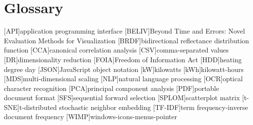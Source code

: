 
\chapter{Glossary}


\begin{acronym}[API]
[API]{application programming interface}
[BELIV]{Beyond Time and Errors: Novel Evaluation Methods for Visualization}
[BRDF]{bidirectional reflectance distribution function}
[CCA]{canonical correlation analysis}
[CSV]{comma-separated values}
[DR]{dimensionality reduction}
[FOIA]{Freedom of Information Act}
[HDD]{heating degree day}
[JSON]{JavaScript object notation}
[kW]{kilowatts}
[kWh]{kilowatt-hours}
[MDS]{multi-dimensional scaling}
[NLP]{natural language processing}
[OCR]{optical character recognition}
[PCA]{principal component analysis}
[PDF]{portable document format}
[SFS]{sequential forward selection}
[SPLOM]{scatterplot matrix}
[t-SNE]{t-distributed stochastic neighbor embedding}
[TF-IDF]{term frequency-inverse document frequency}
[WIMP]{windows-icons-menus-pointer}

\end{acronym}